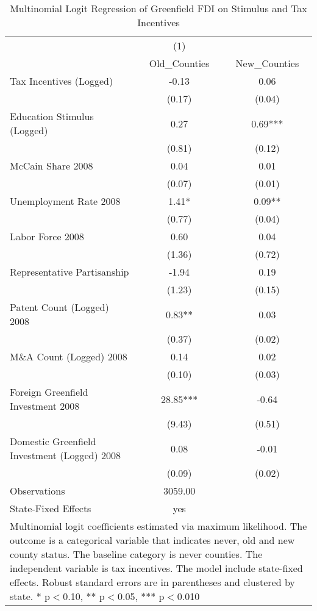 \begin{table}[!htbp]\centering
\def\sym#1{\ifmmode^{#1}\else\(^{#1}\)\fi}
\caption{Multinomial Logit Regression of Greenfield FDI on Stimulus and Tax Incentives}
\begin{tabular}{l*{2}{c}}
\hline\hline
                    &         (1)   &               \\
                    &Old_Counties   &New_Counties   \\
\hline
Tax Incentives (Logged)&       -0.13   &        0.06   \\
                    &      (0.17)   &      (0.04)   \\
Education Stimulus (Logged)&        0.27   &        0.69***\\
                    &      (0.81)   &      (0.12)   \\
McCain Share 2008   &        0.04   &        0.01   \\
                    &      (0.07)   &      (0.01)   \\
Unemployment Rate 2008 &        1.41*  &        0.09** \\
                    &      (0.77)   &      (0.04)   \\
Labor Force 2008    &        0.60   &        0.04   \\
                    &      (1.36)   &      (0.72)   \\
Representative Partisanship&       -1.94   &        0.19   \\
                    &      (1.23)   &      (0.15)   \\
Patent Count (Logged) 2008&        0.83** &        0.03   \\
                    &      (0.37)   &      (0.02)   \\
M\&A Count (Logged) 2008&        0.14   &        0.02   \\
                    &      (0.10)   &      (0.03)   \\
Foreign Greenfield Investment 2008&       28.85***&       -0.64   \\
                    &      (9.43)   &      (0.51)   \\
Domestic Greenfield Investment (Logged) 2008&        0.08   &       -0.01   \\
                    &      (0.09)   &      (0.02)   \\
\hline
Observations        &     3059.00   &               \\
State-Fixed Effects &         yes   &               \\
\hline\hline
\multicolumn{3}{p{\linewidth}}{\footnotesize Multinomial logit coefficients estimated via maximum likelihood. The outcome is a categorical variable that indicates  never, old and new county status. The baseline category is never counties. The independent variable is tax incentives. The model include state-fixed effects. Robust standard errors are in parentheses and clustered by state. * p$<$0.10, ** p$<$0.05, *** p$<$0.010}\\
\end{tabular}
\end{table}
